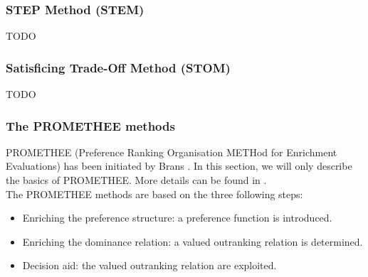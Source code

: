 \subsubsection{STEP Method (STEM)}
TODO

\subsubsection{Satisficing Trade-Off Method (STOM)}
TODO

\subsubsection{The PROMETHEE methods}
PROMETHEE (Preference Ranking Organisation METHod for Enrichment Evaluations) has been initiated by Brans \cite{Brans1}. In this section, we will only describe the basics of PROMETHEE. More details can be found in \cite{Beh2010}.\\
The PROMETHEE methods are based on the three following steps:
\begin{itemize}
\item Enriching the preference structure: a preference function is introduced.
\item Enriching the dominance relation: a valued outranking relation is determined.
\item Decision aid: the valued outranking relation are exploited.
\end{itemize}

